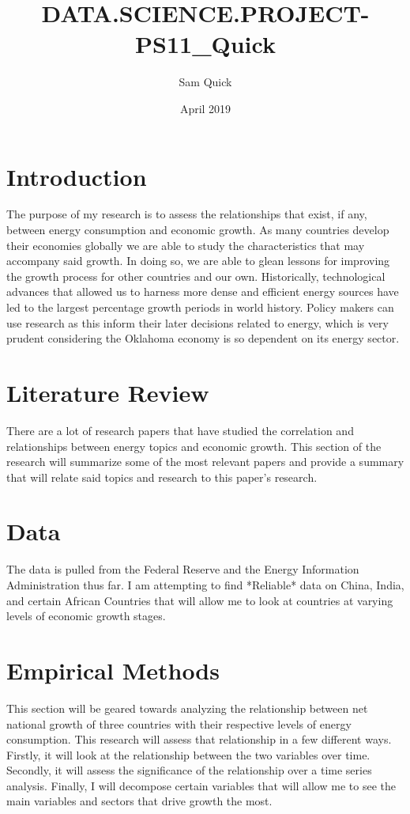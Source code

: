 \documentclass{article}
\title{DATA.SCIENCE.PROJECT-PS11_Quick}
\author{Sam Quick}
\date{April 2019}
\begin{document}
\maketitle

\section{Introduction}
The purpose of my research is to assess the relationships that exist, if any, between energy consumption and economic growth. As many countries develop their economies globally we are able to study the characteristics that may accompany said growth. In doing so, we are able to glean lessons for improving the growth process for other countries and our own. Historically, technological advances that allowed us to harness more dense and efficient energy sources have led to the largest percentage growth periods in world history. Policy makers can use research as this inform their later decisions related to energy, which is very prudent considering the Oklahoma economy is so dependent on its energy sector.

\citep{asafu2000relationship}
\citep{zhang2009energy}
\citep{paul2004causality}
\citep{mehrara2007energy}
\citep{ritchie1981complexities}


\section{Literature Review}
There are a lot of research papers that have studied the correlation and relationships between energy topics and economic growth. This section of the research will summarize some of the most relevant papers and provide a summary that will relate said topics and research to this paper's research.
 
\section{Data}
The data is pulled from the Federal Reserve and the Energy Information Administration thus far. I am attempting to find *Reliable* data on China, India, and certain African Countries that will allow me to look at countries at varying levels of economic growth stages.

\section{Empirical Methods}
This section will be geared towards analyzing the relationship between net national growth of three countries with their respective levels of energy consumption. This research will assess that relationship in a few different  ways. Firstly, it will look at the relationship between the two variables over time. Secondly, it will assess the significance of the relationship   over a time series analysis. Finally, I will decompose certain variables that will allow me to see the main variables and sectors that drive growth the most.
\end{document}

